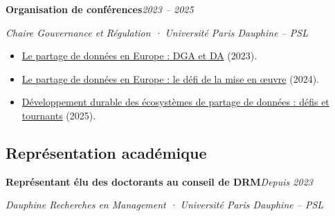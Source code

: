 \documentclass[11pt,a4paper]{article}
\newlength{\cvindent}
\newenvironment{cvblock}[1][1]{%
  \par\noindent\hspace*{#1\cvindent}%
  \begin{minipage}{\dimexpr\linewidth-#1\cvindent\relax}%
}{%
  \end{minipage}\par
}
\newenvironment{cvdetails}{%
  \begin{list}{}{%
    \setlength{\leftmargin}{\cvindent}%
    \setlength{\rightmargin}{0pt}%
    \setlength{\topsep}{0.1em}%
    \setlength{\partopsep}{0pt}%
    \setlength{\parsep}{0.05em}%
    \setlength{\itemsep}{0pt}%
  }\item[]\small\ignorespaces
}{%
  \end{list}
}
\begin{document}
\begin{cvblock}[2]
\textbf{Organisation de conférences}\hfill\textit{2023 -- 2025}\par
\begin{cvdetails}
{\small\itshape Chaire Gouvernance et Régulation · Université Paris Dauphine -- PSL}\par
\begin{itemize}
  \item \href{https://chairgovreg.fondation-dauphine.fr/fr/ressources/1603/replay-data-sharing-europe-dga-and-da-legal-consensus-achievement-implementation}{Le partage de données en Europe : DGA et DA} (2023).
  \item \href{https://chairgovreg.fondation-dauphine.fr/en/publication/1809/synthesis-data-sharing-europe-implementation-challenge}{Le partage de données en Europe : le défi de la mise en œuvre} (2024).
  \item \href{https://www.fondation-dauphine.fr/agenda/2025/08/sustainable-development-data-sharing-ecosystems-challenges-and-turning-points}{Développement durable des écosystèmes de partage de données : défis et tournants} (2025).
\end{itemize}
\end{cvdetails}
\end{cvblock}\par

\subsection*{Représentation académique}
\begin{cvblock}[2]
\textbf{Représentant élu des doctorants au conseil de DRM}\hfill\textit{Depuis 2023}\par
\begin{cvdetails}
{\small\itshape Dauphine Recherches en Management · Université Paris Dauphine -- PSL}
\end{cvdetails}
\end{cvblock}\par
\end{document}
